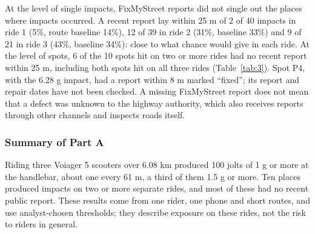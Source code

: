 At the level of single impacts, FixMyStreet reports did not single out the places where
impacts occurred. A recent report lay within 25 m of 2 of 40 impacts in ride 1 (5\%,
route baseline 14\%), 12 of 39 in ride 2 (31\%, baseline 33\%) and 9 of 21 in ride 3
(43\%, baseline 34\%): close to what chance would give in each ride. At the level of
spots, 6 of the 10 spots hit on two or more rides had no recent report within 25 m,
including both spots hit on all three rides (Table~\ref{tab:3}). Spot P4, with the 6.28 g impact,
had a report within 8 m marked ``fixed''; its report and repair dates have not been
checked. A missing FixMyStreet report does not mean that a defect was unknown to the
highway authority, which also receives reports through other channels and inspects
roads itself.

\subsubsection{Summary of Part A}\label{summary-of-part-a}

Riding three Voiager 5 scooters over 6.08 km produced 100 jolts of 1 g or more at the
handlebar, about one every 61 m, a third of them 1.5 g or more. Ten places produced
impacts on two or more separate rides, and most of these had no recent public report.
These results come from one rider, one phone and short routes, and use analyst-chosen
thresholds; they describe exposure on these rides, not the risk to riders in general.
